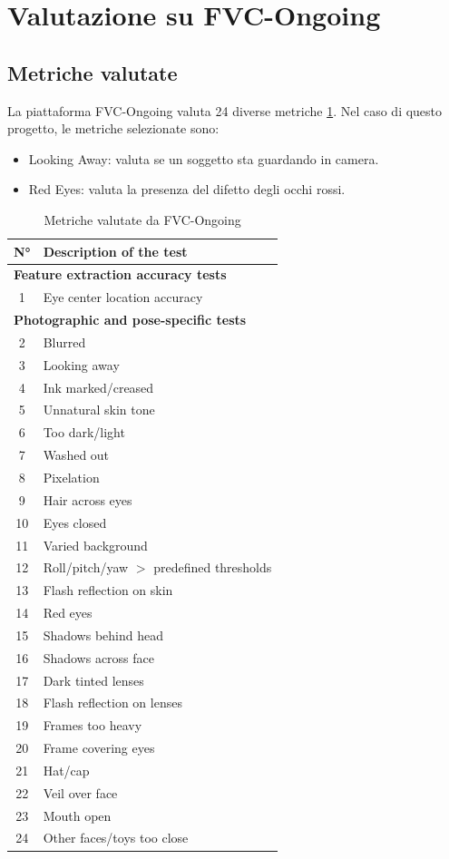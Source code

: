 \documentclass[12pt,a4paper,openright,twoside]{book}
\begin{document}
\section{Valutazione su FVC-Ongoing}

\subsection{Metriche valutate}
La piattaforma FVC-Ongoing valuta 24 diverse metriche \cref{tab:fvc-table}.
Nel caso di questo progetto, le metriche selezionate sono:
\begin{itemize}
    \item Looking Away: valuta se un soggetto sta guardando in camera.
    \item Red Eyes: valuta la presenza del difetto degli occhi rossi.
\end{itemize}

\begin{table}[h!]
\centering
\begin{tabular}{|c|p{10cm}|}
\hline
\textbf{N°} & \textbf{Description of the test} \\
\hline
\multicolumn{2}{|l|}{\textbf{Feature extraction accuracy tests}} \\
\hline
1 & Eye center location accuracy \\
\hline
\multicolumn{2}{|l|}{\textbf{Photographic and pose-specific tests}} \\
\hline
2 & Blurred \\
3 & Looking away \\
4 & Ink marked/creased \\
5 & Unnatural skin tone \\
6 & Too dark/light \\
7 & Washed out \\
8 & Pixelation \\
9 & Hair across eyes \\
10 & Eyes closed \\
11 & Varied background \\
12 & Roll/pitch/yaw $>$ predefined thresholds \\
13 & Flash reflection on skin \\
14 & Red eyes \\
15 & Shadows behind head \\
16 & Shadows across face \\
17 & Dark tinted lenses \\
18 & Flash reflection on lenses \\
19 & Frames too heavy \\
20 & Frame covering eyes \\
21 & Hat/cap \\
22 & Veil over face \\
23 & Mouth open \\
24 & Other faces/toys too close \\
\hline
\end{tabular}
\caption{Metriche valutate da FVC-Ongoing}
\label{tab:fvc-table}
\end{table}
\end{document}
